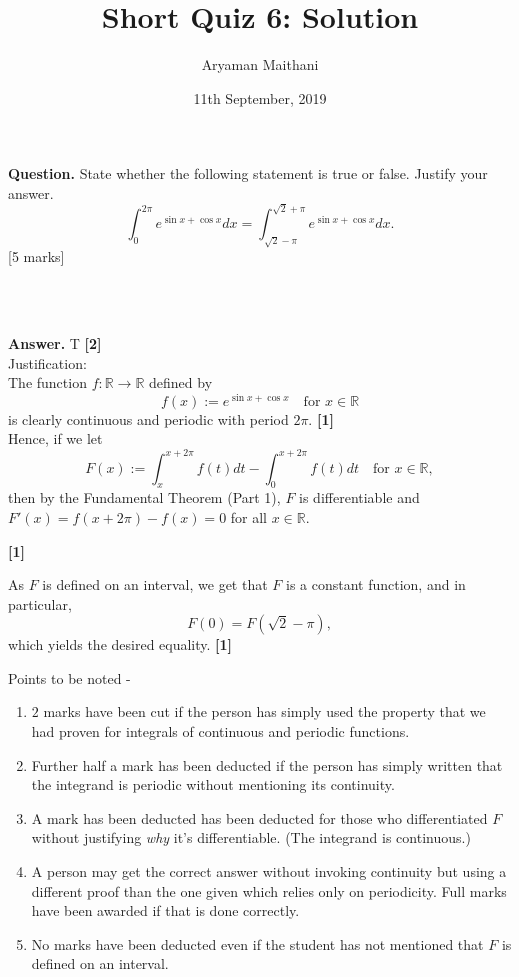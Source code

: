 \documentclass{article}
\title{Short Quiz 6: Solution}      %
\author{Aryaman Maithani}
\date{11th September, 2019}  		 %
\begin{document}
\maketitle

\hrulefill

\textbf{Question.} State whether the following statement is true or false. Justify your answer.
\[\int_{0}^{2\pi} e^{\sin x + \cos x} dx = \int_{\sqrt{2}-\pi}^{\sqrt{2}+\pi} e^{\sin x + \cos x} dx. \]
\hfill [5 marks]
\begin{flushright}
	\\~\\
\end{flushright}

\hrulefill

\textbf{Answer.} T \hfill \textbf{[2]}\\  %
Justification: \\
The function $f:\mathbb{R} \to \mathbb{R}$ defined by
\[f(x) := e^{\sin x + \cos x} \quad \text{for } x \in \mathbb{R}\]
is clearly continuous and periodic with period $2\pi.$ \hfill \textbf{[1]}\\
Hence, if we let
\[F(x) := \int_{x}^{x + 2\pi} f(t)dt - \int_{0}^{x + 2\pi} f(t) dt \quad \text{for }x\in\mathbb{R}, \]
then by the Fundamental Theorem (Part 1), $F$ is differentiable and $F'(x) = f(x+2\pi) - f(x) = 0$ for all $x \in \mathbb{R}.$
\begin{flushright}
\textbf{[1]}
\end{flushright}

As $F$ is defined on an interval, we get that $F$ is a constant function, and in particular,
\[F(0) = F(\sqrt{2} - \pi),\]
which yields the desired equality. \hfill \textbf{[1]}

\hrulefill

\vspace{0.2 cm}

Points to be noted -
\begin{enumerate} 
	\item $2$ marks have been cut if the person has simply used the property that we had proven for integrals of continuous and periodic functions.
	\item Further half a mark has been deducted if the person has simply written that the integrand is periodic without mentioning its continuity.
	\item A mark has been deducted has been deducted for those who differentiated $F$ without justifying \emph{why} it's differentiable. (The integrand is continuous.)
	\item A person may get the correct answer without invoking continuity but using a different proof than the one given which relies only on periodicity. Full marks have been awarded if that is done correctly.
	\item No marks have been deducted even if the student has not mentioned that $F$ is defined on an interval.
\end{enumerate}
\end{document}
